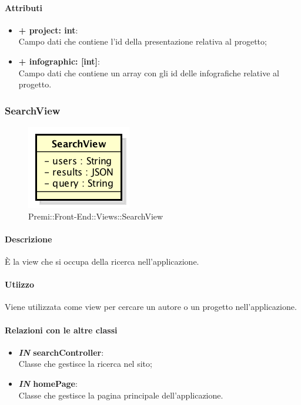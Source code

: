 	\paragraph{Attributi}
	\begin{itemize}
		\item \textbf{+ project: int}:\\
		Campo dati che contiene l'id della presentazione relativa al progetto;
		\item \textbf{+ infographic: [int]}:\\
		Campo dati che contiene un array con gli id delle infografiche relative al progetto.
	\end{itemize}
	

\subsubsection{SearchView}
	\begin{figure}[h]
		\centering
		\includegraphics[width=0.4\linewidth]{img/premi_front_end_views_searchview}
		\caption[Premi::Front-End::Views::SearchView]{Premi::Front-End::Views::SearchView}
	\end{figure}
	
	\paragraph{Descrizione}
	È la view che si occupa della ricerca nell'applicazione.
	
	\paragraph{Utiizzo}
	Viene utilizzata come view per cercare un autore o un progetto nell'applicazione.
	
	\paragraph{Relazioni con le altre classi}
	\begin{itemize}
		\item \textbf{\textit{IN} searchController}:\\
		Classe che gestisce la ricerca nel sito;
		\item \textbf{\textit{IN} homePage}:\\
		Classe che gestisce la pagina principale dell'applicazione.
	\end{itemize}
	
